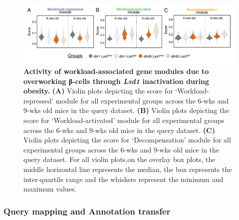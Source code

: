 \begin{figure}[t]
    \centering
    \includegraphics[width=\linewidth]{Chapter5/Fig/F3-17-01.png}
    \caption[Activity of workload-associated gene modules in the query dataset]{\textbf{Activity of workload-associated gene modules due to overworking β-cells through \textit{Lsd1} inactivation during obesity.} \textbf{(A)} Violin plots depicting the score for `Workload-repressed' module for all experimental groups across the 6-wks and 9-wks old mice in the query dataset. \textbf{(B)} Violin plots depicting the score for `Workload-activated' module for all experimental groups across the 6-wks and 9-wks old mice in the query dataset. \textbf{(C)} Violin plots depicting the score for `Decompensation' module for all experimental groups across the 6-wks and 9-wks old mice in the query dataset. For all violin plots,on the overlay box plots, the middle horizontal line represents the median, the box represents the inter-quartile range and the whiskers represent the minimum and maximum values.}
    \label{fig:chp3_valid_study_genescores}
\end{figure}

\subsubsection{\large Query mapping and Annotation transfer}


